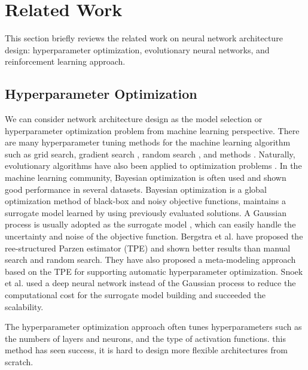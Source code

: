 \section{Related Work}
This section briefly reviews the related work on  neural network architecture design: hyperparameter optimization, evolutionary neural networks, and  reinforcement learning approach.

\subsection{Hyperparameter Optimization}
We can consider  network architecture design as the model selection or hyperparameter optimization problem from  machine learning perspective. There are many hyperparameter tuning methods for the machine learning algorithm\new{,} such as grid search, gradient search \cite{bengio_gradient-based_2000}, random search \cite{bergstra_random_2012}, and  methods \cite{hutter_sequential_2011,snoek_practical_2012}. Naturally, evolutionary algorithms have also been applied to  optimization problems \cite{loshchilov_cma-es_2016}. In the machine learning community, Bayesian optimization is often used and  shown good performance in several datasets. Bayesian optimization is a global optimization method of black-box and noisy objective functions,  maintains a surrogate model learned by using previously evaluated solutions. A Gaussian process is usually adopted as the surrogate model \cite{snoek_practical_2012}, which can easily handle the uncertainty and noise of the objective function.
Bergstra et al. \cite{bergstra_algorithms_2011} have proposed the ree-structured Parzen estimator (TPE) and shown better results than manual search and random search.
They have also proposed a meta-modeling approach \cite{bergstra_making_2013} based on the TPE for supporting automatic hyperparameter optimization. 
Snoek et al. \cite{snoek_scalable_2015} used a deep neural network instead of the Gaussian process to reduce the computational cost for the surrogate model building and succeeded  the scalability.

The hyperparameter optimization approach often tunes  hyperparameters\new{,} such as the numbers of layers and neurons, and the type of activation functions.  this method has seen success, it is hard to design more flexible architectures from scratch.

